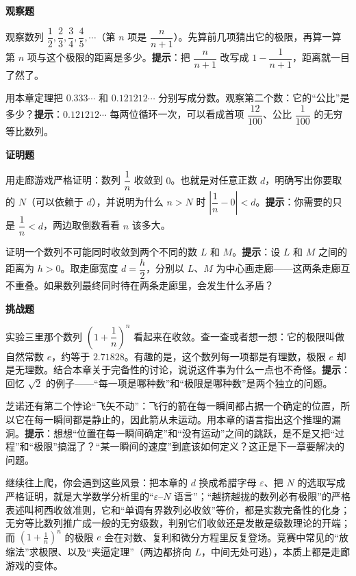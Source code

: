 \textbf{观察题}
\begin{sikao}
  \item 观察数列 $\dfrac{1}{2},\dfrac{2}{3},\dfrac{3}{4},\dfrac{4}{5},\cdots$（第 $n$ 项是 $\dfrac{n}{n+1}$）。先算前几项猜出它的极限，再算一算第 $n$ 项与这个极限的距离是多少。\textbf{提示}：把 $\dfrac{n}{n+1}$ 改写成 $1-\dfrac{1}{n+1}$，距离就一目了然了。
  \item 用本章定理把 $0.333\cdots$ 和 $0.121212\cdots$ 分别写成分数。观察第二个数：它的“公比”是多少？\textbf{提示}：$0.121212\cdots$ 每两位循环一次，可以看成首项 $\dfrac{12}{100}$、公比 $\dfrac{1}{100}$ 的无穷等比数列。
\end{sikao}

\textbf{证明题}
\begin{sikao}
  \item 用走廊游戏严格证明：数列 $\dfrac{1}{n}$ 收敛到 $0$。也就是对任意正数 $d$，明确写出你要取的 $N$（可以依赖于 $d$），并说明为什么 $n>N$ 时 $\left|\dfrac{1}{n}-0\right|<d$。\textbf{提示}：你需要的只是 $\dfrac{1}{n}<d$，两边取倒数看看 $n$ 该多大。
  \item 证明一个数列不可能同时收敛到两个不同的数 $L$ 和 $M$。\textbf{提示}：设 $L$ 和 $M$ 之间的距离为 $h>0$。取走廊宽度 $d=\dfrac{h}{2}$，分别以 $L$、$M$ 为中心画走廊——这两条走廊互不重叠。如果数列最终同时待在两条走廊里，会发生什么矛盾？
\end{sikao}

\textbf{挑战题}
\begin{sikao}
  \item 实验三里那个数列 $\left(1+\dfrac{1}{n}\right)^n$ 看起来在收敛。查一查或者想一想：它的极限叫做自然常数 $e$，约等于 $2.71828$。有趣的是，这个数列每一项都是有理数，极限 $e$ 却是无理数。结合本章关于完备性的讨论，说说这件事为什么一点也不奇怪。\textbf{提示}：回忆 $\sqrt{2}$ 的例子——“每一项是哪种数”和“极限是哪种数”是两个独立的问题。
  \item 芝诺还有第二个悖论“飞矢不动”：飞行的箭在每一瞬间都占据一个确定的位置，所以它在每一瞬间都是静止的，因此箭从未运动。用本章的语言指出这个推理的漏洞。\textbf{提示}：想想“位置在每一瞬间确定”和“没有运动”之间的跳跃，是不是又把“过程”和“极限”搞混了？“某一瞬间的速度”到底该如何定义？这正是下一章要解决的问题。
\end{sikao}

\begin{pandeng}
继续往上爬，你会遇到这些风景：把本章的 $d$ 换成希腊字母 $\varepsilon$、把 $N$ 的选取写成严格证明，就是大学数学分析里的“$\varepsilon$--$N$ 语言”；“越挤越拢的数列必有极限”的严格表述叫柯西收敛准则，它和“单调有界数列必收敛”等价，都是实数完备性的化身；无穷等比数列推广成一般的无穷级数，判别它们收敛还是发散是级数理论的开端；而 $\left(1+\frac{1}{n}\right)^n$ 的极限 $e$ 会在对数、复利和微分方程里反复登场。竞赛中常见的“放缩法”求极限、以及“夹逼定理”（两边都挤向 $L$，中间无处可逃），本质上都是走廊游戏的变体。
\end{pandeng}


